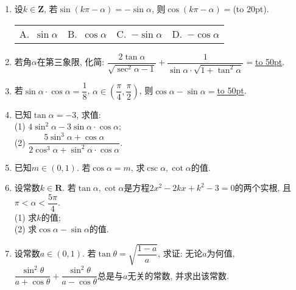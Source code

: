 \documentclass[10pt,a4paper]{article}
\newcommand{\blank}[1]{\underline{\hbox to #1pt{}}}
\newcommand{\bracket}[1]{(\hbox to #1pt{})}
\newcommand{\fourch}[4]{\par\begin{tabular}{p{.23\textwidth}p{.23\textwidth}p{.23\textwidth}p{.23\textwidth}}
A.~#1 &B.~#2& C.~#3& D.~#4
\end{tabular}}
\begin{document}
\begin{enumerate}[1.]
\item 设$k\in \mathbf{Z}$, 若$\sin(k\pi-\alpha)=-\sin\alpha$, 则$\cos(k\pi-\alpha)=$\bracket{20}.
\fourch{$\sin\alpha$}{$\cos\alpha$}{$-\sin\alpha$}{$-\cos\alpha$}
\item 若角$\alpha$在第三象限, 化简: $\dfrac{2\tan\alpha}{\sqrt{\sec^2\alpha-1}}+\dfrac 1{\sin\alpha\cdot \sqrt{1+\tan^2\alpha}}=$\blank{50}.
\item 若$\sin\alpha\cdot \cos\alpha=\dfrac 18$, $\alpha\in (\dfrac{\pi}4,\dfrac{\pi}2)$, 则$\cos\alpha-\sin\alpha=$\blank{50}.
\item 已知$\tan\alpha=-3$, 求值:\\
(1) $4\sin^2\alpha-3\sin\alpha\cdot \cos\alpha$;\\
(2) $\dfrac{5\sin^3\alpha+\cos\alpha}{2\cos^3\alpha+\sin^2\alpha\cdot \cos\alpha}$.
\item 已知$m\in (0,1)$. 若$\cos\alpha=m$, 求$\csc\alpha,\cot\alpha$的值.
\item 设常数$k\in \mathbf{R}$. 若$\tan\alpha,\cot\alpha$是方程$2x^2-2kx+k^2-3=0$的两个实根, 且$\pi<\alpha<\dfrac{5\pi}4$.\\
(1) 求$k$的值;\\
(2) 求$\cos\alpha-\sin\alpha$的值.
\item 设常数$a\in (0,1)$. 若$\tan\theta=\sqrt{\dfrac{1-a}a}$, 求证: 无论$a$为何值, $\dfrac{\sin^2\theta}{a+\cos\theta}+\dfrac{\sin^2\theta}{a-\cos\theta}$总是与$a$无关的常数, 并求出该常数.



\end{enumerate}
\end{document}
